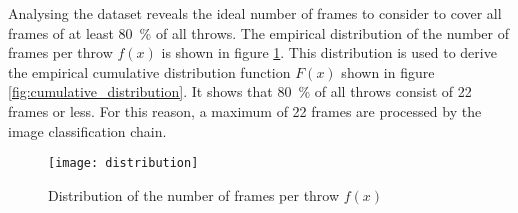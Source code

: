 Analysing the dataset reveals the ideal number of frames to consider to cover all frames of at least \SI{80}{\percent} of all throws.
The empirical distribution of the number of frames per throw $f(x)$ is shown in figure \ref{fig:distribution}.
This distribution is used to derive the empirical cumulative distribution function $F(x)$ shown in figure \ref{fig:cumulative_distribution}.
It shows that \SI{80}{\percent} of all throws consist of \num{22} frames or less.
For this reason, a maximum of \num{22} frames are processed by the image classification chain.

\begin{figure}
  \centering
  \texttt{[image: distribution]}
  \caption{Distribution of the number of frames per throw $f(x)$}
  \label{fig:distribution}
\end{figure}

